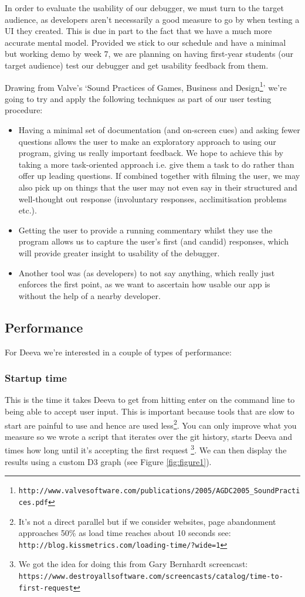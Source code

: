 \documentclass[11pt, a4paper]{article}
\begin{document}
In order to evaluate the usability of our debugger, we must turn to the target audience, as developers aren't necessarily a good measure to go by when testing a UI they created. This is due in part to the fact that we have a much more accurate mental model. Provided we stick to our schedule and have a minimal but working demo by week 7, we are planning on having first-year students (our target audience) test our debugger and get usability feedback from them.

Drawing from Valve's `Sound Practices of Games, Business and Design\footnote{\tt{http://www.valvesoftware.com/publications/2005/AGDC2005\_SoundPractices.pdf}}' we're going to try and apply the following techniques as part of our user testing procedure:
\begin{itemize}
\item Having a minimal set of documentation (and on-screen cues) and asking fewer questions allows the user to make an exploratory approach to using our program, giving us really important feedback. We hope to achieve this by taking a more task-oriented approach i.e. give them a task to do rather than offer up leading questions. If combined together with filming the user, we may also pick up on things that the user may not even say in their structured and well-thought out response (involuntary responses, acclimitisation problems etc.).
\item Getting the user to provide a running commentary whilst they use the program allows us to capture the user's first (and candid) responses, which will provide greater insight to usability of the debugger.
\item Another tool was (as developers) to not say anything, which really just enforces the first point, as we want to ascertain how usable our app is without the help of a nearby developer.
\end{itemize}

\subsection{Performance}
For Deeva we're interested in a couple of types of performance:
\subsubsection{Startup time}
This is the time it takes Deeva to get from hitting enter on the command line to being able to accept user input. This is important because tools that are slow to start are painful to use and hence are used less\footnote{It's not a direct parallel but if we consider websites, page abandonment approaches 50\% as load time reaches about 10 seconds see: \tt{http://blog.kissmetrics.com/loading-time/?wide=1}}. You can only improve what you measure so we wrote a script that iterates over the git history, starts Deeva and times how long until it's accepting the first request \footnote{We got the idea for doing this from Gary Bernhardt screencast: \newline
 \tt{https://www.destroyallsoftware.com/screencasts/catalog/time-to-first-request}}. We can then display the results using a custom D3 graph (see Figure \ref{fig:figure1}).
 
\end{document}
